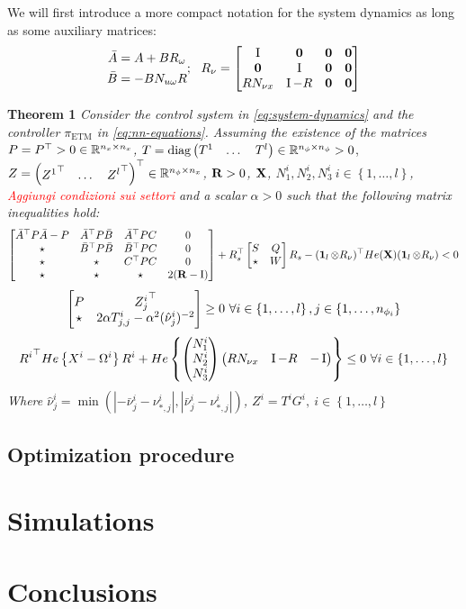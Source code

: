 \documentclass{article}
\begin{document}
We will first introduce a more compact notation for the system dynamics as long as some auxiliary matrices:
\begin{equation}
\begin{aligned}
    \bar{A} &= A + B R_{\omega}\\
    \bar{B} &= -B N_{u \omega} R\\
\end{aligned};\ \ 
R_{\nu} = \bmx{
  \Id & \0 & \0 & \0\\
  \0 & \Id & \0 & \0\\
  R N_{\nu x} & \Id - R & \0 & \0\\
}
\end{equation}

\textbf{Theorem 1} \emph{ Consider the control system in \ref{eq:system-dynamics} and the controller $\pi_{\text{ETM}}$ in \ref{eq:nn-equations}. Assuming the existence of the matrices $P = P^\top > 0 \in {\mathbb{R}}^{n_x \times n_x}$,} $T = \text{diag} \left(\begin{matrix}T^1 & \dots & T^l\end{matrix}\right) \in {\mathbb{R}}^{n_{\phi} \times n_{\phi}} > 0$, \emph{$Z = \left(\begin{matrix}{Z^1}^\top & \dots & {Z^l}^\top\end{matrix}\right)^\top \in {\mathbb{R}}^{n_{\phi} \times n_x}$, ${\bf{R}} > 0$, ${\bf{X}}$, $N^i_1, N^i_2, N^i_3 \ i \in \left\{ 1, \dots, l \right\}$, \textcolor{red}{Aggiungi condizioni sui settori} and a scalar $\alpha > 0$ such that the following matrix inequalities hold:}
\begin{equation}\label{eqn:lyapunov}
  \left[\begin{matrix}
    \bar{A}^\top P \bar{A} - P & \bar{A}^\top P \bar{B} & \bar{A}^\top P C & 0\\
    \star & \bar{B}^\top P \bar{B} & \bar{B}^\top P C & 0\\
    \star & \star & C^\top P C & 0\\
    \star & \star & \star & 2 ({\bf{R}} - \operatorname{I})
  \end{matrix}\right] + R_s^\top \left[\begin{matrix}
    S & Q\\
    \star & W
  \end{matrix}\right]  R_s - (\operatorname{\mathbf{1}}_l \otimes R_{\nu})^\top He({\bf{X}}) (\operatorname{\mathbf{1}}_l \otimes R_{\nu}) < 0
\end{equation}
\begin{equation}\label{eqn:inclusion}
  \left[\begin{matrix}
    P & {Z_j^i}^\top\\
    \star & 2 \alpha T^i_{j,j} - \alpha^2 (\hat{\nu}_j^i)^{-2}
  \end{matrix}\right] \geq 0 \ \forall i \in \left\{ 1, \dots, l \right\}, j \in \left\{ 1, \dots, n_{\phi_i} \right\}
\end{equation}
\begin{equation}\label{eqn:finsler-conditions}
  {R^i}^\top He\left\{X^i - \Omega^i\right\} R^i + He\left\{ \left(\begin{matrix}N^i_1\\ N^i_2\\ N^i_3\end{matrix}\right) \left(\begin{matrix}R N_{\nu x} & \operatorname{I} - R & -\operatorname{I}\end{matrix}\right)\right\} \leq 0 \ \forall i \in \left\{ 1, \dots, l \right\}
\end{equation}
\emph{Where $\hat{\nu}_j^i = \min(|-\bar{\nu}_j^i - \nu^i_{*, j}|,|\bar{\nu}_j^i - \nu^i_{*, j}|)$, $Z^i = T^i G^i,\ i \in \left\{ 1, \dots, l \right\} $}

\subsection{Optimization procedure}

\section{Simulations}

\section{Conclusions}

\printbibliography
\end{document}
